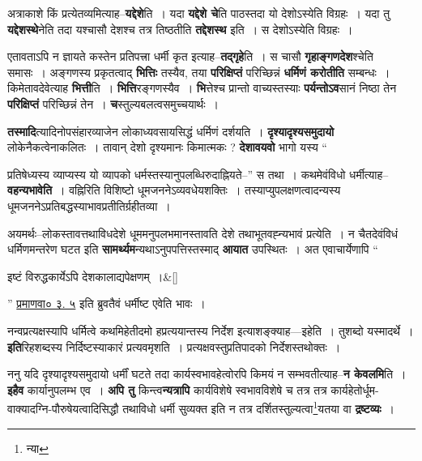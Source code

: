 \documentclass[article,12pt,a4paper]{memoir}
\begin{document}
	  \pstart अत्राकाशे किं प्रत्येतव्यमित्याह--\textbf{यद्देशे}ति । यदा \textbf{यद्देशे चे}ति पाठस्तदा यो देशोऽस्येति विग्रहः । यदा तु \textbf{यद्देशस्थे}नेति तदा यश्चासौ देशश्च तत्र तिष्ठतीति \textbf{तद्देशस्थ} इति । स देशोऽस्येति विग्रहः ।
	\pend
      

	  \pstart एतावताऽपि न ज्ञायते कस्तेन प्रतिपत्त्रा धर्मी कृत इत्याह--\textbf{तद्गृहे}ति । स चासौ \textbf{गृहाङ्गणदेश}श्चेति समासः । अङ्गणस्य प्रकृतत्वाद् \textbf{भित्तिः} तस्यैव, तया \textbf{परिक्षिप्तं} परिच्छिन्नं \textbf{धर्मिणं करोतीति} सम्बन्धः । किमेतावदेवेत्याह \textbf{भित्ती}ति । \textbf{भित्ति}रङ्गणस्यैव । \textbf{भि}त्तेश्च प्रान्तो वाच्यस्तस्याः \textbf{पर्यन्तोऽव}सानं निष्ठा तेन \textbf{परिक्षिप्तं} परिच्छिन्नं तेन । \textbf{च}स्तुल्यबलत्वसमुच्चयार्थः ।
	\pend
      

	  \pstart \textbf{तस्मादि}त्यादिनोपसंहारव्याजेन लोकाध्यवसायसिद्धं धर्मिणं दर्शयति । \textbf{दृश्यादृश्यसमुदायो} लोकेनैकत्वेनाकलितः । तावान् देशो दृश्यमानः किमात्मकः ? \textbf{देशावयवो} भागो यस्य  \leavevmode{} “
	  
	प्रतिषेध्यस्य व्याप्यस्य यो व्यापको धर्मस्तस्यानुपलब्धिरुदाह्नियते--” स तथा । कथमेवंविधो धर्मीत्याह--\textbf{वहन्यभावेति} । वह्निरिति विशिष्टो धूमजननेऽव्यवधेयशक्तिः । तस्याप्युपलक्षणत्वादन्यस्य धूमजननेऽप्रतिबद्धस्याभावप्रतीतिर्ग्रहीतव्या ।
	\pend
      

	  \pstart अयमर्थः--लोकस्तावत्तथाविधदेशे धूममनुपलभमानस्तावति देशे तथाभूतवह्न्यभावं प्रत्येति । न चैतदेवंविधं धर्मिणमन्तरेण घटत इति \textbf{सामर्थ्यम}न्यथाऽनुपपत्तिस्तस्माद् \textbf{आयात} उपस्थितः । अत एवाचार्येणापि “
	    \pend
	  
	    
	    \stanza[\smallbreak]
	इष्टं विरुद्धकार्येऽपि देशकालाद्यपेक्षणम् ।\&[\smallbreak]


	
	    \pstart
	  ” \href{http://http://sarit.indology.info/?cref=pv.3.5}{प्रमाणवा० ३. ५} इति ब्रुवतैवं धर्मीष्ट एवेति भावः ।
	\pend
      

	  \pstart नन्वप्रत्यक्षस्यापि धर्मित्वे कथमिहेतीदमो हप्रत्ययान्तस्य निर्देश इत्याशङ्क्याह—इहेति । तुशब्दो यस्मादर्थे । \textbf{इति}रिहशब्दस्य निर्दिष्टस्याकारं प्रत्यवमृशति । प्रत्यक्षवस्तुप्रतिपादको निर्देशस्तथोक्तः ।
	\pend
      

	  \pstart ननु यदि दृश्यादृश्यसमुदायो धर्मीं घटते तदा कार्यस्वभावहेत्वोरपि किमयं न सम्भवतीत्याह--\textbf{न केवलमि}ति । \textbf{इहैव} कार्यानुपलम्भ एव । \textbf{अपि तु} किन्त्व\textbf{न्यत्रापि} कार्यविशेषे स्वभावविशेषे च तत्र तत्र कार्यहेतोर्धूम-वाक्यादग्नि-पौरुषेयत्वादिसिद्धौ तथाविधो धर्मी सुव्यक्त इति न तत्र दर्शितस्तुल्यत्वा\footnote{न्या}यतया वा \textbf{द्रष्टव्यः} ।
	\pend
      
\end{document}
